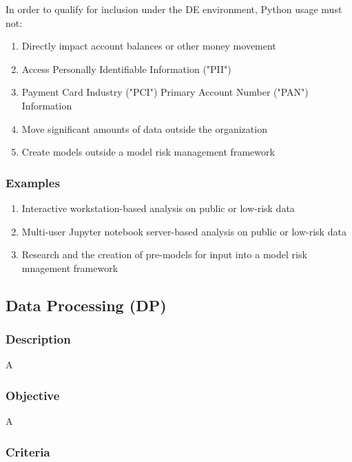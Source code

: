 			In order to qualify for inclusion under the DE environment, Python usage must not:

			\begin{enumerate}
        		\item Directly impact account balances or other money movement
        		\item Access Personally Identifiable Information ("PII")
        		\item Payment Card Industry ("PCI") Primary Account Number ("PAN") Information
        		\item Move significant amounts of data outside the organization
        		\item Create models outside a model risk management framework
        	\end{enumerate}

		\subsubsection{Examples}

			\begin{enumerate}
        		\item Interactive workstation-based analysis on public or low-risk data
        		\item Multi-user Jupyter notebook server-based analysis on public or low-risk data
        		\item Research and the creation of pre-models for input into a model risk mnagement framework
        	\end{enumerate}



	\subsection{Data Processing (DP)}

		\subsubsection{Description}

			A

		\subsubsection{Objective}

			A

		\subsubsection{Criteria}

